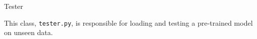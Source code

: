 \begin{section}{Tester}
    \par This class, \texttt{tester.py}, is responsible for loading and testing a pre-trained model on unseen data.
    
\end{section}
\clearpage